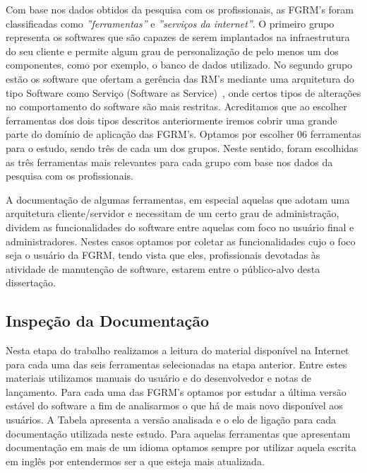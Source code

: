 Com base nos dados obtidos da pesquisa com os profissionais, as FGRM's foram
classificadas como \textit{''ferramentas''} e \textit{''serviços da internet''}.
O primeiro grupo representa os softwares que são capazes de serem implantados na
infraestrutura do seu cliente e permite algum grau de personalização de pelo
menos um dos componentes, como por exemplo, o banco de dados utilizado. No
segundo grupo estão os software que ofertam a gerência das RM's mediante uma
arquitetura do tipo Software como Serviço (Software as
Service)~\cite{fox2013engineering}, onde certos tipos de alterações no
comportamento do software são mais restritas. Acreditamos que ao escolher
ferramentas dos dois tipos descritos anteriormente iremos cobrir uma
grande parte do domínio de aplicação das FGRM's. Optamos por escolher 06
ferramentas para o estudo, sendo três de cada um dos grupos. Neste sentido,
foram escolhidas as três ferramentas mais relevantes para cada grupo com base
nos dados da pesquisa com os profissionais.

A documentação de algumas ferramentas, em especial aquelas que adotam uma
arquitetura cliente/servidor e necessitam de um certo grau de administração,
dividem as funcionalidades do software entre aquelas com foco no usuário final e
administradores. Nestes casos optamos por coletar as funcionalidades cujo o foco
seja o usuário da FGRM, tendo vista que eles, profissionais devotadas às
atividade de manutenção de software, estarem entre o público-alvo desta
dissertação.

\subsection{Inspeção da Documentação}
\label{subsec:inspecao_doumentacao}

Nesta etapa do trabalho realizamos a leitura do material disponível na Internet
para cada uma das seis ferramentas selecionadas na etapa anterior. Entre estes
materiais utilizamos manuais do usuário e do desenvolvedor e notas de
lançamento. Para cada uma das FGRM's optamos por estudar a última versão estável
do software a fim de analisarmos o que há de mais novo disponível aos usuários.
A Tabela apresenta a versão analisada e o elo de ligação para cada documentação
utilizada neste estudo. Para aquelas ferramentas que apresentam documentação em
mais de um idioma optamos sempre por utilizar aquela escrita em inglês por
entendermos ser a que esteja mais atualizada.


